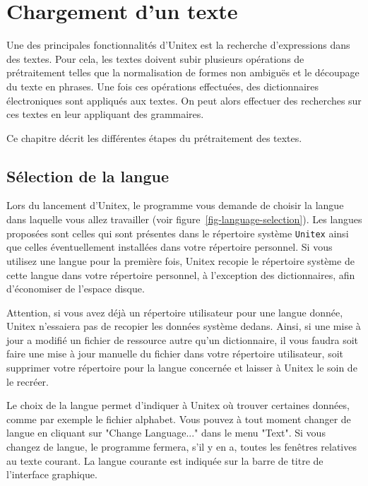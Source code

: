 \chapter{Chargement d’un texte}
\label{chap-text}

\noindent Une des principales fonctionnalités d’Unitex est la recherche d’expressions dans des
textes. Pour cela, les textes doivent subir plusieurs opérations de prétraitement telles que
la normalisation de formes non ambiguës et le découpage du texte en phrases. Une fois
ces opérations effectuées, des dictionnaires électroniques sont appliqués aux textes. On peut
alors effectuer des recherches sur ces textes en leur appliquant des grammaires.


\bigskip
\noindent Ce chapitre décrit les différentes étapes du prétraitement des textes.


\section{Sélection de la langue}
\noindent Lors du lancement d’Unitex, le programme vous demande de choisir la langue dans laquelle
vous allez travailler (voir figure~\ref{fig-language-selection}). Les langues proposées sont celles
qui sont présentes dans le répertoire système \verb+Unitex+ ainsi que celles éventuellement
installées dans votre répertoire personnel. Si vous utilisez une langue pour la première fois,
Unitex recopie le répertoire système de cette langue dans votre répertoire personnel, à l’exception
des  dictionnaires, afin d’économiser de l’espace disque.


\bigskip
\noindent Attention, si vous avez déjà un répertoire utilisateur pour une langue donnée, Unitex
n’essaiera pas de recopier les données système dedans. Ainsi, si une mise à jour a modifié un
fichier de ressource autre qu’un dictionnaire, il vous faudra soit faire une mise à jour manuelle
du fichier dans votre répertoire utilisateur, soit supprimer votre répertoire pour la langue
concernée et laisser à Unitex le soin de le recréer.


\bigskip
\noindent 
Le choix de la langue permet d’indiquer à Unitex où trouver certaines données, comme par exemple le
fichier alphabet.  Vous pouvez à tout moment changer de langue en cliquant
sur "Change Language..." dans le menu "Text". Si vous changez de langue, le programme fermera,
s’il y en a, toutes les fenêtres relatives au texte courant. La langue courante est indiquée sur
la barre de titre de l’interface graphique.


